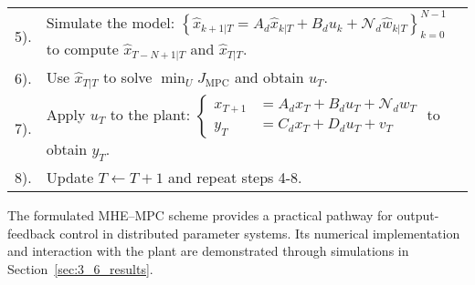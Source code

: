 \begin{table}[htbp]
\begin{tabular}{@{}p{}p{}@{}}
5). & Simulate the model: $\left\{ \hat{x}_{k+1|T} = A_d \hat{x}_{k|T} + B_d u_k + \mathcal{N}_d \hat{w}_{k|T} \right\}_{k=0}^{N-1}$
    to compute $\hat{x}_{T-N+1|T}$ and $\hat{x}_{T|T}$. \\

6). & Use $\hat{x}_{T|T}$ to solve $\min_{U} J_{\mathrm{MPC}}$ and obtain $u_T$. \\

7). & Apply $u_T$ to the plant: $\left\{ \begin{array}{ll}
x_{T+1} &= A_d x_T + B_d u_T + \mathcal{N}_d w_T \\
y_T &= C_d x_T + D_d u_T + v_T
\end{array} \right.$ to obtain $y_T$. \\

8). & Update $T \leftarrow T + 1$ and repeat steps 4-8. \\

\hline\hline
\end{tabular}
\end{table}

The formulated MHE--MPC scheme provides a practical pathway for output-feedback control in distributed parameter systems. Its numerical implementation and interaction with the plant are demonstrated through simulations in Section~\ref{sec:3_6_results}.


